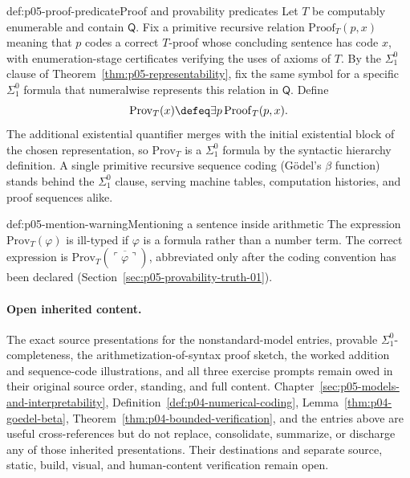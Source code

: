 \begin{hbdefinition}{def:p05-proof-predicate}{Proof and provability predicates}
Let \(T\) be computably enumerable and contain \(\mathsf Q\).  Fix a
primitive recursive relation \(\mathrm{Proof}_T(p,x)\) meaning that
\(p\) codes a correct \(T\)-proof whose concluding sentence has code
\(x\), with enumeration-stage certificates verifying the uses of axioms
of \(T\).  By the \(\Sigma^0_1\) clause of
Theorem~\ref{thm:p05-representability}, fix the same symbol for a
specific \(\Sigma^0_1\) formula that numeralwise represents this relation
in \(\mathsf Q\).  Define
\[
  \mathrm{Prov}_T(x)\defeq\exists p\,\mathrm{Proof}_T(p,x).
\]
The additional existential quantifier merges with the initial existential
block of the chosen representation, so \(\mathrm{Prov}_T\) is a
\(\Sigma^0_1\) formula by the syntactic hierarchy definition.  A single
primitive recursive sequence coding (G\"odel's \(\beta\) function) stands
behind the \(\Sigma^0_1\) clause, serving machine tables, computation
histories, and proof sequences alike.
\end{hbdefinition}

\begin{hbwarning}{def:p05-mention-warning}{Mentioning a sentence inside arithmetic}
The expression \(\mathrm{Prov}_T(\varphi)\) is ill-typed if \(\varphi\)
is a formula rather than a number term.  The correct expression is
\(\mathrm{Prov}_T(\overline{\ulcorner\varphi\urcorner})\), abbreviated
only after the coding convention has been declared
(Section~\ref{sec:p05-provability-truth-01}).
\end{hbwarning}

\paragraph{Open inherited content.}
The exact source presentations for the nonstandard-model entries,
provable \(\Sigma^0_1\)-completeness, the arithmetization-of-syntax proof
sketch, the worked addition and sequence-code illustrations, and all three
exercise prompts remain owed in their original source order, standing, and
full content.  Chapter~\ref{sec:p05-models-and-interpretability},
Definition~\ref{def:p04-numerical-coding},
Lemma~\ref{thm:p04-goedel-beta},
Theorem~\ref{thm:p04-bounded-verification}, and the entries above are useful
cross-references but do not replace, consolidate, summarize, or discharge
any of those inherited presentations.  Their destinations and separate
source, static, build, visual, and human-content verification remain open.


